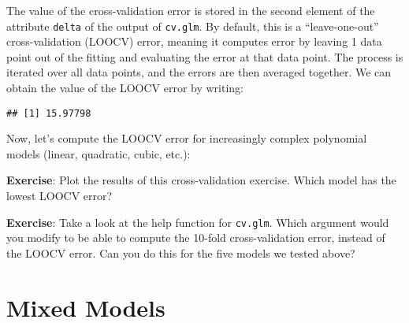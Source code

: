 \documentclass[
]{book}
\newenvironment{Shaded}{\begin{snugshade}}{\end{snugshade}}
\newcommand{\AttributeTok}[1]{\textcolor[rgb]{0.77,0.63,0.00}{#1}}
\newcommand{\ControlFlowTok}[1]{\textcolor[rgb]{0.13,0.29,0.53}{\textbf{#1}}}
\newcommand{\DecValTok}[1]{\textcolor[rgb]{0.00,0.00,0.81}{#1}}
\newcommand{\FunctionTok}[1]{\textcolor[rgb]{0.00,0.00,0.00}{#1}}
\newcommand{\NormalTok}[1]{#1}
\newcommand{\OtherTok}[1]{\textcolor[rgb]{0.56,0.35,0.01}{#1}}
\newcommand{\SpecialCharTok}[1]{\textcolor[rgb]{0.00,0.00,0.00}{#1}}
\begin{document}
The value of the cross-validation error is stored in the second element of the attribute \texttt{delta} of the output of \texttt{cv.glm}. By default, this is a ``leave-one-out'' cross-validation (LOOCV) error, meaning it computes error by leaving 1 data point out of the fitting and evaluating the error at that data point. The process is iterated over all data points, and the errors are then averaged together. We can obtain the value of the LOOCV error by writing:

\begin{Shaded}
\end{Shaded}

\begin{verbatim}
## [1] 15.97798
\end{verbatim}

Now, let's compute the LOOCV error for increasingly complex polynomial models (linear, quadratic, cubic, etc.):

\begin{Shaded}
\end{Shaded}

\textbf{Exercise}: Plot the results of this cross-validation exercise. Which model has the lowest LOOCV error?

\textbf{Exercise}: Take a look at the help function for \texttt{cv.glm}. Which argument would you modify to be able to compute the 10-fold cross-validation error, instead of the LOOCV error. Can you do this for the five models we tested above?

\hypertarget{mixed-models}{%
\chapter{Mixed Models}\label{mixed-models}}
\end{document}
